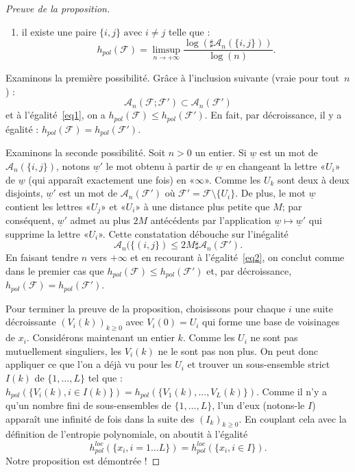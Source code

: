 \documentclass[11pt]{article}
\providecommand{\og}{«\nobreakspace}
\providecommand{\fg}{\nobreakspace»}
\theoremstyle{definition}
\numberwithin{equation}{section}
\numberwithin{figure}{section}
\numberwithin{table}{section}
\newcommand*\cA{{\mathcal A}}
\newcommand*\cF{{\mathcal F}}
\begin{document}
\begin{proof}[Preuve de la proposition]
\begin{enumerate}
\item \label{item2} il existe une paire $\{i,j\} \text{ avec } i \neq j$ telle que :
\begin{equation}\label{eq2}
h_{pol}(\cF) = \limsup_{n \to +\infty} \frac{\log(\sharp\cA_n(\{i,j\}))}{\log(n)}.
\end{equation}
\end{enumerate}

Examinons la première possibilité. Grâce à l'inclusion suivante (vraie pour tout~$n$) :
\[
\cA_n(\cF;\cF') \subset \cA_n(\cF')
\]
et à l'égalité~\eqref{eq1}, on a $h_{pol}(\cF) \leq h_{pol}(\cF')$. En fait, par décroissance, il y a égalité : $h_{pol}(\cF) = h_{pol}(\cF')$.

Examinons la seconde possibilité. Soit $n>0$ un entier. Si $\underline{w}$ est un mot de $\cA_n(\{i,j\})$, notons $\underline{w}'$ le mot obtenu à partir de $\underline{w}$ en changeant la lettre \og$U_i$\fg{} de $\underline{w}$ (qui apparaît exactement une fois) en \og$\infty$\fg. Comme les $U_k$ sont deux à deux disjoints, $\underline{w}'$ est un mot de $\cA_n(\cF')$ où $\cF'=\cF\setminus\{U_i\}$. De plus, le mot $\underline{w}$ contient les lettres \og$U_j$\fg{} et \og$U_i$\fg{} à une distance plus petite que $M$; par conséquent, $\underline{w}'$ admet au plus ${2M}$ antécédents par l'application $\underline{w} \mapsto \underline{w}'$ qui supprime la lettre \og$U_i$\fg. Cette constatation débouche sur l'inégalité
\[
\cA_n(\{(i,j\}) \leq 2M \sharp \cA_n(\cF').
\]
En faisant tendre $n$ vers $+\infty$ et en recourant à l'égalité~\eqref{eq2}, on conclut comme dans le premier cas que $h_{pol}(\cF) \leq h_{pol}(\cF')$ et, par décroissance, $h_{pol}(\cF) = h_{pol}(\cF')$.

Pour terminer la preuve de la proposition, choisissons pour chaque $i$ une suite décroissante $(V_i(k))_{k \geq 0}$ avec $V_i(0) = U_i$ qui forme une base de voisinages de $x_i$. Considérons maintenant un entier $k$. Comme les $U_i$ ne sont pas mutuellement singuliers, les $V_i(k)$ ne le sont pas non plus. On peut donc appliquer ce que l'on a déjà vu pour les $U_i$ et trouver un sous-ensemble strict $I(k)$ de $\{1, \dots, L\}$ tel que : $ h_{pol}(\{V_i{(k)}, i\in I(k)\}) = h_{pol}(\{V_1(k), \dots, V_L(k)\})$. Comme il n'y a qu'un nombre fini de sous-ensembles de $\{1, \dots, L\}$, l'un d'eux (notons-le $I$) apparaît une infinité de fois dans la suite des $(I_k)_{k\geq 0}$. En couplant cela avec la définition de l'entropie polynomiale, on aboutit à l'égalité
\[
h^{loc}_{pol}(\{x_i, i=1 \dots L\}) = h^{loc}_{pol}(\{x_i, i\in I\}).
\]
Notre proposition est démontrée !
\end{proof}
\end{document}
